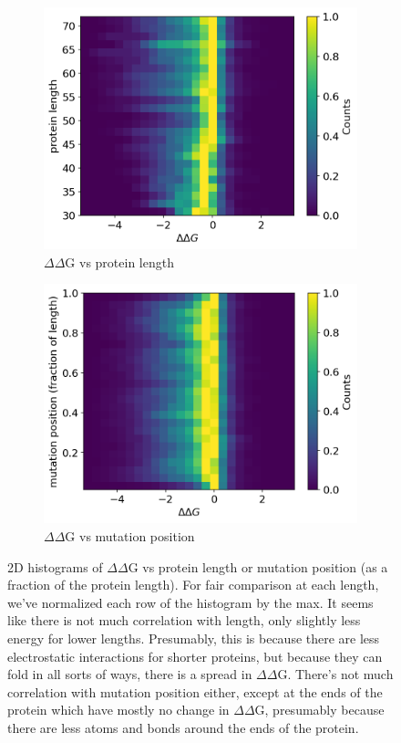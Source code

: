 \documentclass{article}
\newcommand{\dd}{$\Delta\Delta$}
\begin{document}
\begin{figure}[!htb]
    \centering
    \begin{subfigure}[b]{0.45\textwidth}
        \centering
        \includegraphics[width=\textwidth]{plots/protein_lengths.png}
        \caption{$\Delta\Delta$G vs protein length}
        \label{fig:lengths}
    \end{subfigure}
    \hfill
    \begin{subfigure}[b]{0.45\textwidth}
        \centering
        \includegraphics[width=\textwidth]{plots/mutation_position.png}
        \caption{$\Delta\Delta$G vs mutation position}
        \label{fig:position}
    \end{subfigure}
    \caption{2D histograms of $\Delta\Delta$G vs protein length or mutation position (as a fraction of the protein length). For fair comparison at each length, we've normalized each row of the histogram by the max. It seems like there is not much correlation with length, only slightly less energy for lower lengths. Presumably, this is because there are less electrostatic interactions for shorter proteins, but because they can fold in all sorts of ways, there is a spread in \dd G. There's not much correlation with mutation position either, except at the ends of the protein which have mostly no change in \dd G, presumably because there are less atoms and bonds around the ends of the protein.}
    \label{fig:lenpos}
\end{figure}
\end{document}
